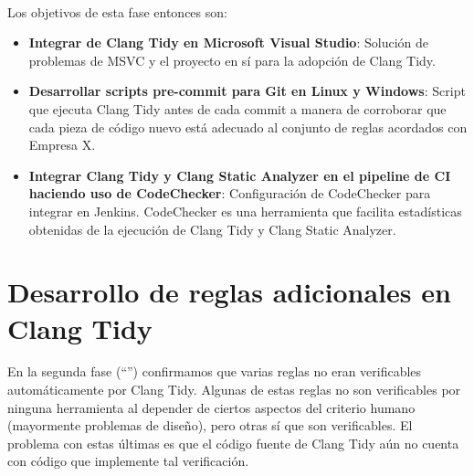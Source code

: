 \documentclass[12pt]{extreport} %
\begin{document}
\paragraph{}
Los objetivos de esta fase entonces son:
\begin{itemize}
\item \textbf{Integrar de Clang Tidy en Microsoft Visual Studio}:
  Solución de problemas de MSVC y el proyecto en sí para la adopción
  de Clang Tidy.
\item \textbf{Desarrollar scripts pre-commit para Git en Linux y
  Windows}: Script que ejecuta Clang Tidy antes de cada commit a
  manera de corroborar que cada pieza de código nuevo está adecuado al
  conjunto de reglas acordados con Empresa X.
\item \textbf{Integrar Clang Tidy y Clang Static Analyzer en el
  pipeline de CI haciendo uso de CodeChecker}: Configuración de
  CodeChecker para integrar en Jenkins.  CodeChecker es una
  herramienta que facilita estadísticas obtenidas de la ejecución de
  Clang Tidy y Clang Static Analyzer.
\end{itemize}

\section{Desarrollo de reglas adicionales en Clang Tidy}

En la segunda fase (``'') confirmamos que varias
reglas no eran verificables automáticamente por Clang Tidy. Algunas de
estas reglas no son verificables por ninguna herramienta al depender
de ciertos aspectos del criterio humano (mayormente problemas de
diseño), pero otras sí que son verificables. El problema con estas
últimas es que el código fuente de Clang Tidy aún no cuenta con
código que implemente tal verificación.
\end{document}
